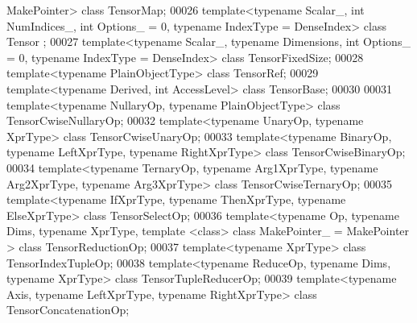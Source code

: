 \begin{DoxyCode}
      MakePointer> \textcolor{keyword}{class }TensorMap;
00026 \textcolor{keyword}{template}<\textcolor{keyword}{typename} Scalar\_, \textcolor{keywordtype}{int} NumIndices\_, \textcolor{keywordtype}{int} Options\_ = 0, \textcolor{keyword}{typename} IndexType = DenseIndex> \textcolor{keyword}{class }Tensor
      ;
00027 \textcolor{keyword}{template}<\textcolor{keyword}{typename} Scalar\_, \textcolor{keyword}{typename} Dimensions, \textcolor{keywordtype}{int} Options\_ = 0, \textcolor{keyword}{typename} IndexType = DenseIndex> \textcolor{keyword}{class }
      TensorFixedSize;
00028 \textcolor{keyword}{template}<\textcolor{keyword}{typename} PlainObjectType> \textcolor{keyword}{class }TensorRef;
00029 \textcolor{keyword}{template}<\textcolor{keyword}{typename} Derived, \textcolor{keywordtype}{int} AccessLevel> \textcolor{keyword}{class }TensorBase;
00030 
00031 \textcolor{keyword}{template}<\textcolor{keyword}{typename} NullaryOp, \textcolor{keyword}{typename} PlainObjectType> \textcolor{keyword}{class }TensorCwiseNullaryOp;
00032 \textcolor{keyword}{template}<\textcolor{keyword}{typename} UnaryOp, \textcolor{keyword}{typename} XprType> \textcolor{keyword}{class }TensorCwiseUnaryOp;
00033 \textcolor{keyword}{template}<\textcolor{keyword}{typename} BinaryOp, \textcolor{keyword}{typename} LeftXprType, \textcolor{keyword}{typename} RightXprType> \textcolor{keyword}{class }TensorCwiseBinaryOp;
00034 \textcolor{keyword}{template}<\textcolor{keyword}{typename} TernaryOp, \textcolor{keyword}{typename} Arg1XprType, \textcolor{keyword}{typename} Arg2XprType, \textcolor{keyword}{typename} Arg3XprType> \textcolor{keyword}{class }
      TensorCwiseTernaryOp;
00035 \textcolor{keyword}{template}<\textcolor{keyword}{typename} IfXprType, \textcolor{keyword}{typename} ThenXprType, \textcolor{keyword}{typename} ElseXprType> \textcolor{keyword}{class }TensorSelectOp;
00036 \textcolor{keyword}{template}<\textcolor{keyword}{typename} Op, \textcolor{keyword}{typename} Dims, \textcolor{keyword}{typename} XprType, \textcolor{keyword}{template} <\textcolor{keyword}{class}> \textcolor{keyword}{class }MakePointer\_ = MakePointer > \textcolor{keyword}{
      class }TensorReductionOp;
00037 \textcolor{keyword}{template}<\textcolor{keyword}{typename} XprType> \textcolor{keyword}{class }TensorIndexTupleOp;
00038 \textcolor{keyword}{template}<\textcolor{keyword}{typename} ReduceOp, \textcolor{keyword}{typename} Dims, \textcolor{keyword}{typename} XprType> \textcolor{keyword}{class }TensorTupleReducerOp;
00039 \textcolor{keyword}{template}<\textcolor{keyword}{typename} Axis, \textcolor{keyword}{typename} LeftXprType, \textcolor{keyword}{typename} RightXprType> \textcolor{keyword}{class }TensorConcatenationOp;

\end{DoxyCode}
